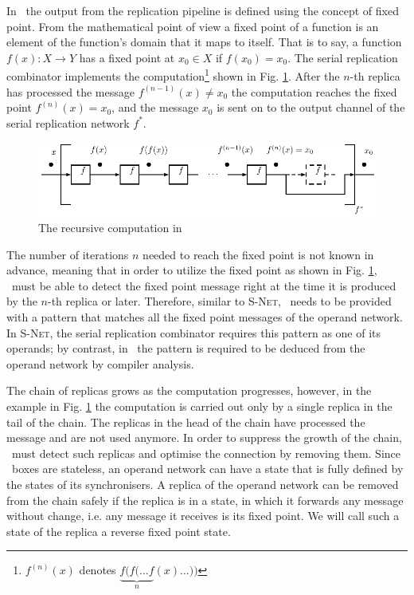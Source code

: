 In \ak\, the output from the replication pipeline is defined using the concept of fixed point. From the mathematical point of view a fixed point of a function is an element of the function's domain that it maps to itself. That is to say, a function $f(x): X \to Y$ has a fixed point at $x_0 \in X$ if $f(x_0) = x_0$. The serial replication combinator implements the computation\footnote{$f^{(n)}(x)$ denotes $\underbrace{f(f(\dots f}_n (x) \dots))$} shown in Fig. \ref{fig:fp}. After the $n$-th replica has processed the message $f^{(n-1)}(x) \neq x_0$ the computation reaches the fixed point $f^{(n)}(x) = x_0$, and the message $x_0$ is sent on to the output channel of the serial replication network $f^{*}$.
\begin{figure}[h!]
\centering
\includegraphics[scale=0.8]{figs/chapter_03_fp.pdf}
\caption{The recursive computation in \ak\ }
\label{fig:fp}
\end{figure}

The number of iterations $n$ needed to reach the fixed point is not known in advance, meaning that in order to utilize the fixed point as shown in Fig. \ref{fig:fp}, \ak\ must be able to detect the fixed point message right at the time it is produced by the $n$-th replica or later. Therefore, similar to \textsc{S-Net}, \ak\ needs to be provided with a pattern that matches all the fixed point messages of the operand network. In \textsc{S-Net}, the serial replication combinator requires this pattern as one of its operands; by contrast, in \ak\ the pattern is required to be deduced from the operand network by compiler analysis.

The chain of replicas grows as the computation progresses, however, in the example in Fig. \ref{fig:fp} the computation is carried out only by a single replica in the tail of the chain. The replicas in the head of the chain have processed the message and are not used anymore. In order to suppress the growth of the chain, \ak\ must detect such replicas and optimise the connection by removing them. Since \ak\ boxes are stateless, an operand network can have a state that is fully defined by the states of its synchronisers. A replica of the operand network can be removed from the chain safely if the replica is in a state, in which it forwards any message without change, i.e. any message it receives is its fixed point. We will call such a state of the replica a reverse fixed point state.

